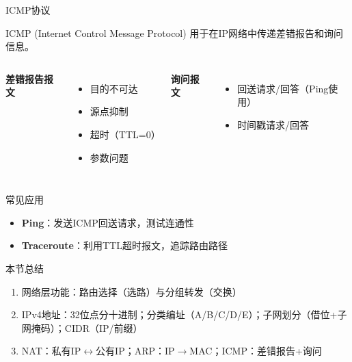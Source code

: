 \documentclass[10pt, aspectratio=169]{beamer}
\begin{document}
\begin{frame}{ICMP协议}
    \begin{block}{ICMP (Internet Control Message Protocol)}
        用于在IP网络中传递差错报告和询问信息。
    \end{block}
    \vspace{0.3em}
    \begin{columns}[t]
        \textbf{差错报告报文}
        \begin{itemize}
            \item 目的不可达
            \item 源点抑制
            \item 超时（TTL=0）
            \item 参数问题
        \end{itemize}
        \textbf{询问报文}
        \begin{itemize}
            \item 回送请求/回答（Ping使用）
            \item 时间戳请求/回答
        \end{itemize}
    \end{columns}
    \vspace{0.5em}
    \begin{exampleblock}{常见应用}
        \begin{itemize}
            \item \textbf{Ping}：发送ICMP回送请求，测试连通性
            \item \textbf{Traceroute}：利用TTL超时报文，追踪路由路径
        \end{itemize}
    \end{exampleblock}
\end{frame}

\begin{frame}{本节总结}
    \begin{enumerate}
        \item 网络层功能：路由选择（选路）与分组转发（交换）
        \item IPv4地址：32位点分十进制；分类编址（A/B/C/D/E）；子网划分（借位+子网掩码）；CIDR（IP/前缀）
        \item NAT：私有IP$\leftrightarrow$公有IP；ARP：IP$\rightarrow$MAC；ICMP：差错报告+询问
    \end{enumerate}
\end{frame}
\end{document}
